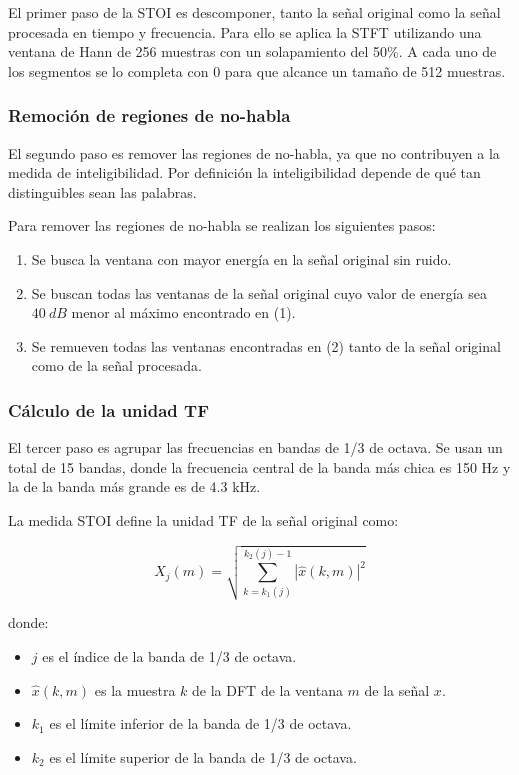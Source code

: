 El primer paso de la STOI es descomponer, tanto la señal original como la señal procesada en tiempo y frecuencia. Para ello se aplica la STFT utilizando una ventana de Hann de 256 muestras con un solapamiento del 50\%. A cada uno de los segmentos se lo completa con 0 para que alcance un tamaño de 512 muestras.

\subsubsection{Remoción de regiones de no-habla}

El segundo paso es remover las regiones de no-habla, ya que no contribuyen a la medida de inteligibilidad. Por definición la inteligibilidad depende de qué tan distinguibles sean las palabras.

Para remover las regiones de no-habla se realizan los siguientes pasos:

\begin{enumerate}
	\item Se busca la ventana con mayor energía en la señal original sin ruido.
	\item Se buscan todas las ventanas de la señal original cuyo valor de energía sea $\SI{40}{dB}$ menor al máximo encontrado en (1).
	\item Se remueven todas las ventanas encontradas en (2) tanto de la señal original como de la señal procesada.
\end{enumerate}

\subsubsection{Cálculo de la unidad TF}

El tercer paso es agrupar las frecuencias en bandas de 1/3 de octava. Se usan un total de 15 bandas, donde la frecuencia central de la banda más chica es 150 Hz y la de la banda más grande es de 4.3 kHz. 

La medida STOI define la unidad TF de la señal original como:

\begin{equation*}
	X_j(m) = \sqrt{\sum_{k=k_1(j)}^{k_2(j) - 1} | \hat{x}(k,m) |^2}
\end{equation*}

donde:

\begin{itemize}
	\item $j$ es el índice de la banda de 1/3 de octava.
	\item $\hat{x}(k,m)$ es la muestra $k$ de la DFT de la ventana $m$ de la señal $x$.
	\item $k_1$ es el límite inferior de la banda de 1/3 de octava.
	\item $k_2$ es el límite superior de la banda de 1/3 de octava.
\end{itemize}

